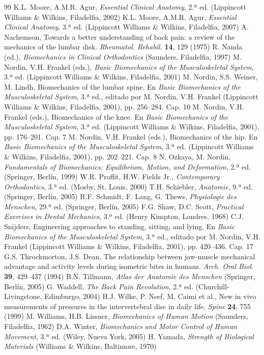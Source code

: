 \documentclass[12pt]{book}
\begin{document}
\begin{thebibliography}{99}
 K.L. Moore, A.M.R. Agur, \textit{Essential Clinical Anatomy}, 2.ª ed. (Lippincott Williams \& Wilkins, Filadelfia, 2002)
 K.L. Moore, A.M.R. Agur, \textit{Essential Clinical Anatomy}, 3.ª ed. (Lippincott Williams \& Wilkins, Filadelfia, 2007)
 A. Nachemson, Towards a better understanding of back pain: a review of the mechanics of the lumbar disk. \textit{Rheumatol. Rehabil.} \textbf{14}, 129 (1975)
 R. Nanda (ed.), \textit{Biomechanics in Clinical Orthodontics} (Saunders, Filadelfia, 1997)
 M. Nordin, V.H. Frankel (eds.), \textit{Basic Biomechanics of the Musculoskeletal System}, 3.ª ed. (Lippincott Williams \& Wilkins, Filadelfia, 2001)
 M. Nordin, S.S. Weiner, M. Lindh, Biomechanics of the lumbar spine. En \textit{Basic Biomechanics of the Musculoskeletal System}, 3.ª ed., editado por M. Nordin, V.H. Frankel (Lippincott Williams \& Wilkins, Filadelfia, 2001), pp. 256--284. Cap. 10
 M. Nordin, V.H. Frankel (eds.), Biomechanics of the knee. En \textit{Basic Biomechanics of the Musculoskeletal System}, 3.ª ed. (Lippincott Williams \& Wilkins, Filadelfia, 2001), pp. 176--201. Cap. 7
 M. Nordin, V.H. Frankel (eds.), Biomechanics of the hip. En \textit{Basic Biomechanics of the Musculoskeletal System}, 3.ª ed. (Lippincott Williams \& Wilkins, Filadelfia, 2001), pp. 202--221. Cap. 8
 N. Ozkaya, M. Nordin, \textit{Fundamentals of Biomechanics: Equilibrium, Motion, and Deformation}, 2.ª ed. (Springer, Berlín, 1999)
 W.R. Proffit, H.W. Fields Jr., \textit{Contemporary Orthodontics}, 3.ª ed. (Mosby, St. Louis, 2000)
 T.H. Schiebler, \textit{Anatomie}, 9.ª ed. (Springer, Berlín, 2005)
 R.F. Schmidt, F. Lang, G. Thews, \textit{Physiologie des Menschen}, 29.ª ed. (Springer, Berlín, 2005)
 F.G. Shaw, D.C. Scott, \textit{Practical Exercises in Dental Mechanics}, 3.ª ed. (Henry Kimpton, Londres, 1968)
 C.J. Snijders, Engineering approaches to standing, sitting, and lying. En \textit{Basic Biomechanics of the Musculoskeletal System}, 3.ª ed., editado por M. Nordin, V.H. Frankel (Lippincott Williams \& Wilkins, Filadelfia, 2001), pp. 420--436. Cap. 17
 G.S. Throckmorton, J.S. Dean, The relationship between jaw-muscle mechanical advantage and activity levels during isometric bites in humans. \textit{Arch. Oral Biol.} \textbf{39}, 429--437 (1994)
 B.N. Tillmann, \textit{Atlas der Anatomie des Menschen} (Springer, Berlín, 2005)
 G. Waddell, \textit{The Back Pain Revolution}, 2.ª ed. (Churchill-Livingstone, Edimburgo, 2004)
 H.J. Wilke, P. Neef, M. Caimi et al., New in vivo measurements of pressures in the intervertebral disc in daily life. \textit{Spine} \textbf{24}, 755 (1999)
 M. Williams, H.B. Lissner, \textit{Biomechanics of Human Motion} (Saunders, Filadelfia, 1962)
 D.A. Winter, \textit{Biomechanics and Motor Control of Human Movement}, 3.ª ed. (Wiley, Nueva York, 2005)
 H. Yamada, \textit{Strength of Biological Materials} (Williams \& Wilkins, Baltimore, 1970)
\end{thebibliography}
\end{document}
